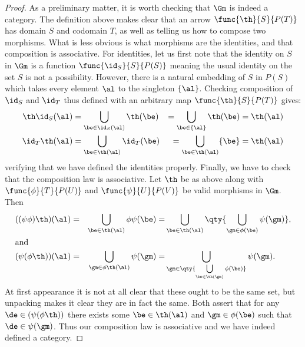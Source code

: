 \documentclass[main.tex]{subfiles}
\begin{document}
\begin{proof}
	As a preliminary matter, it is worth checking that \(\Gm\) is indeed a
	category. The definition above makes clear that an arrow
	\(\func{\th}{S}{P(T)}\) has domain \(S\) and codomain \(T\), as well as
	telling us how to compose two morphisms. What is less obvious is what
	morphisms are the identities, and that composition is associative. For
	identities, let us first note that the identity on \(S\) in \(\Gm\) is a
	function \(\func{\id_S}{S}{P(S)}\) meaning the usual identity on the set
	\(S\) is not a possibility. However, there is a natural embedding of \(S\)
	in \(P(S)\) which takes every element \(\al\) to the singleton \(\{\al\}\).
	Checking composition of \(\id_S\) and \(\id_T\) thus defined with an
	arbitrary map \(\func{\th}{S}{P(T)}\) gives:
	\begin{alignat*}{4}
		\th\id_S(\al)&=
		\bigcup_{\be\in\id_S(\al)}\th(\be)&=
		\bigcup_{\be\in\{\al\}}\th(\be)&=
		\th(\al) \\
		\id_T\th(\al)&=
		\bigcup_{\be\in\th(\al)}\id_T(\be)&=
		\bigcup_{\be\in\th(\al)}\{\be\}&=
		\th(\al)
	\end{alignat*} verifying that we have defined the identities properly.
	Finally, we have to check that the composition law is associative. Let
	\(\th\) be as above along with \(\func{\phi}{T}{P(U)}\) and
	\(\func{\psi}{U}{P(V)}\) be valid morphisms in \(\Gm\). Then
	\begin{alignat*}{3}
		((\psi\phi)\th)(\al)=&&
		\bigcup_{\be\in\th(\al)}\phi\psi(\be)=&
		\bigcup_{\be\in\th(\al)}\qty{\bigcup_{\gm\in\phi(\be)}\psi(\gm)},\\
		\intertext{and}
		(\psi(\phi\th))(\al)=&&
		\bigcup_{\gm\in\phi\th(\al)}\psi(\gm)=&
		\bigcup_{\gm\in\qty{\bigcup\limits_{\be\in\th(\gm)}\phi(\be)}}\psi(\gm).
	\end{alignat*}
	At first appearance it is not at all clear that these ought to be the same
	set, but unpacking makes it clear they are in fact the same. Both assert
	that for any \(\de\in(\psi(\phi\th))\) there exists some \(\be\in\th(\al)\)
	and \(\gm\in\phi(\be)\) such that \(\de\in\psi(\gm)\). Thus our composition
	law is associative and we have indeed defined a category.


\end{proof}
\end{document}
